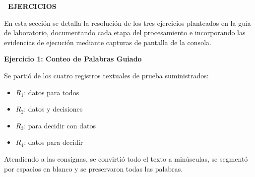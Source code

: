 \documentclass[12pt,a4paper]{article}
\newcommand{\llav}{\symbol{60}\symbol{60}}
\newcommand{\rlav}{\symbol{62}\symbol{62}}
\newcommand{\marcador}[1]{\llav\ #1\ \rlav}
\newcommand{\seccion}[1]{%
  \vspace{0.6cm}%
  {\centering\bfseries\fontsize{12pt}{14pt}\selectfont\marcador{\MakeUppercase{#1}}\par}%
  \vspace{0.35cm}%
}
\begin{document}
\clearpage

\seccion{EJERCICIOS}

En esta sección se detalla la resolución de los tres ejercicios planteados en la guía de laboratorio, documentando cada etapa del procesamiento e incorporando las evidencias de ejecución mediante capturas de pantalla de la consola.

\vspace{0.2cm}
\noindent\textbf{Ejercicio 1: Conteo de Palabras Guiado}

Se partió de los cuatro registros textuales de prueba suministrados:
\begin{itemize}
    \item $R_1$: \guillemotleft datos para todos\guillemotright
    \item $R_2$: \guillemotleft datos y decisiones\guillemotright
    \item $R_3$: \guillemotleft para decidir con datos\guillemotright
    \item $R_4$: \guillemotleft datos para decidir\guillemotright
\end{itemize}

Atendiendo a las consignas, se convirtió todo el texto a minúsculas, se segmentó por espacios en blanco y se preservaron todas las palabras.
\end{document}
